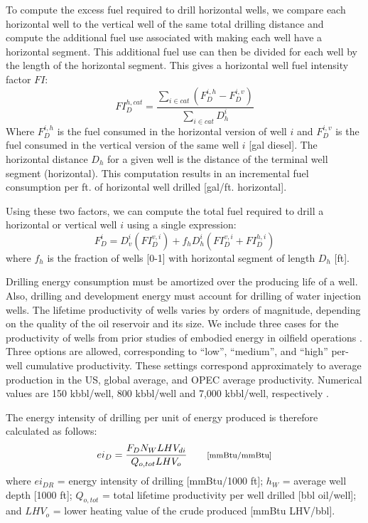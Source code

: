 \documentclass[11pt]{report}
\newcommand{\marg}[1]{{\footnotesize\textit{\textcolor{stanford}{'#1'}}}}
\newcommand{\marginnote}[1]{\marginpar{\marg{#1}}}
\begin{document}
To compute the excess fuel required to drill horizontal wells, we compare each horizontal well to the vertical well of the same total drilling distance and compute the additional fuel use associated with making each well have a horizontal segment.  This additional fuel use can then be divided for each well by the length of the horizontal segment. This gives a horizontal well fuel intensity factor $FI$:
\begin{equation}
FI_{D}^{h,cat} = \frac{\sum_{i \in cat} \left(F_{D}^{i,h} - F_{D}^{i,v} \right)}{\sum_{i \in cat} D_{h}^{i}}
\end{equation}
Where $F_{D}^{i,h}$ is the fuel consumed in the horizontal version of well $i$ and $F_{D}^{i,v}$ is the fuel consumed in the vertical version of the same well $i$ [gal diesel].  The horizontal distance $D_{h}$ for a given well is the distance of the terminal well segment (horizontal).  This computation results in an incremental fuel consumption per ft. of horizontal well drilled [gal/ft. horizontal]. 

Using these two factors, we can compute the total fuel required to drill a horizontal or vertical well $i$ using a single expression:
\begin{equation}
F_{D}^{i} =  D_{v}^{i}\left( FI_{D}^{v,i} \right)+ f_h D_{h}^{i} \left(FI_{D}^{v,i} + FI_{D}^{h,i}  \right)
\end{equation}
where $f_h$ is the fraction of wells [0-1] with horizontal segment of length $D_h$ [ft].

Drilling energy consumption must be amortized over the producing life of a well. Also, drilling and development energy must account for drilling of water injection wells. The lifetime productivity of wells varies by orders of magnitude, depending on the quality of the oil reservoir and its size. We include three cases for the productivity of wells from prior studies of embodied energy in oilfield operations \cite{Brandt2015}.  Three options are allowed, corresponding to ``low'', ``medium'', and ``high'' per-well cumulative productivity. These settings correspond approximately to average production in the US, global average, and OPEC average productivity. Numerical values are 150 kbbl/well, 800 kbbl/well and 7,000 kbbl/well, respectively \cite[Supporting Information Table S1]{Brandt2015}.

The energy intensity of drilling per unit of energy produced is therefore calculated as follows: \marginnote{Drilling \& Development 2.3}
\begin{equation}
ei_{D} = \frac{F_{D} N_{W}LHV_{di}}{Q_{o,tot} LHV_o} \quad\quad \footnotesize{\text{[mmBtu/mmBtu]}}
\end{equation}
where $ei_{DR}$ = energy intensity of drilling [mmBtu/1000 ft]; $h_W$ = average well depth [1000 ft]; $Q_{o,tot}$ = total lifetime productivity per well drilled [bbl oil/well]; and $LHV_o$ = lower heating value of the crude produced [mmBtu LHV/bbl].
\end{document}
